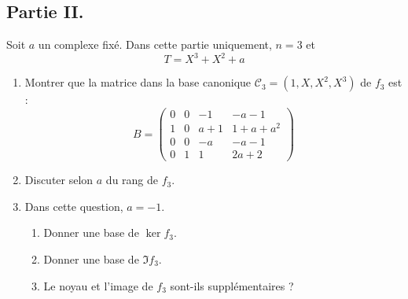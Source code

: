 \subsection*{Partie II.}
Soit $a$ un complexe fixé. Dans cette partie uniquement, $n=3$ et
\begin{displaymath}
 T=X^3+X^2+a
\end{displaymath}
 \begin{enumerate}
 \item Montrer que la matrice dans la base canonique $\mathcal C_3 =(1,X,X^2,X^3)$ de $f_3$ est :
\begin{displaymath}
 B=
\begin{pmatrix}
 0 & 0 & -1 & -a-1 \\
1 & 0 & a+1 & 1+a+a^2 \\
0 & 0 & -a & -a-1 \\
0 & 1 & 1 & 2a+2
\end{pmatrix}
\end{displaymath}
\item Discuter selon $a$ du rang de $f_3$.
\item Dans cette question, $a=-1$.
\begin{enumerate}
 \item Donner une base de $\ker f_3$.
\item Donner une base de $\Im f_3$.
\item Le noyau et l'image de $f_3$ sont-ils supplémentaires ?
\end{enumerate}
\end{enumerate}

